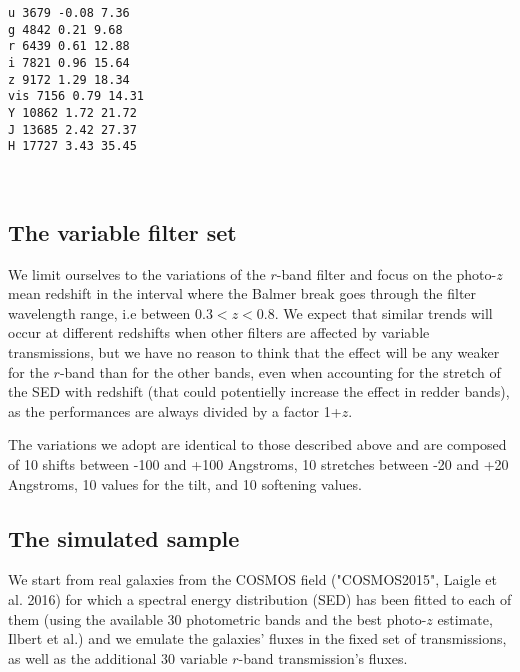 \documentclass[11pt]{article}
\begin{document}
    \begin{Verbatim}[commandchars=\\\{\}]
u 3679 -0.08 7.36
g 4842 0.21 9.68
r 6439 0.61 12.88
i 7821 0.96 15.64
z 9172 1.29 18.34
vis 7156 0.79 14.31
Y 10862 1.72 21.72
J 13685 2.42 27.37
H 17727 3.43 35.45

    \end{Verbatim}

    \begin{center}
    \end{center}
    { \hspace*{\fill} \\}
    
    \subsection{The variable filter set}\label{the-variable-filter-set}

We limit ourselves to the variations of the \(r\)-band filter and focus
on the photo-\(z\) mean redshift in the interval where the Balmer break
goes through the filter wavelength range, i.e between \(0.3<z<0.8\). We
expect that similar trends will occur at different redshifts when other
filters are affected by variable transmissions, but we have no reason to
think that the effect will be any weaker for the \(r\)-band than for the
other bands, even when accounting for the stretch of the SED with
redshift (that could potentielly increase the effect in redder bands),
as the performances are always divided by a factor 1+\(z\).

The variations we adopt are identical to those described above and are
composed of 10 shifts between -100 and +100 Angstroms, 10 stretches
between -20 and +20 Angstroms, 10 values for the tilt, and 10 softening
values.

    \subsection{The simulated sample}\label{the-simulated-sample}

We start from real galaxies from the COSMOS field ("COSMOS2015", Laigle
et al. 2016) for which a spectral energy distribution (SED) has been
fitted to each of them (using the available 30 photometric bands and the
best photo-\(z\) estimate, Ilbert et al.) and we emulate the galaxies'
fluxes in the fixed set of transmissions, as well as the additional 30
variable \(r\)-band transmission's fluxes.
\end{document}
